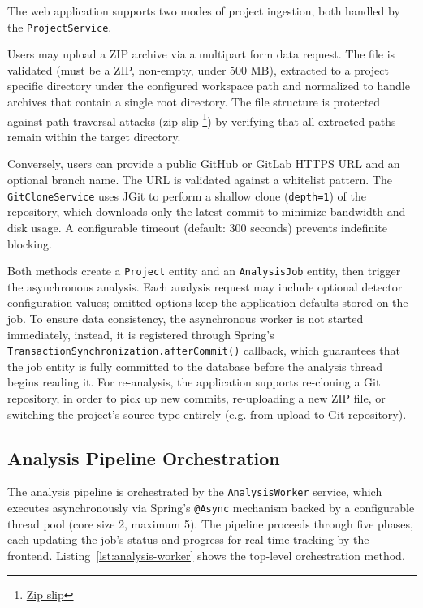 \par The web application supports two modes of project ingestion, both handled by the \texttt{ProjectService}.

\par Users may upload a ZIP archive via a multipart form data request. The file is validated (must be a ZIP, non-empty, under 500 MB), extracted to a project specific directory under the configured workspace path and normalized to handle archives that contain a single root directory. The file structure is protected against path traversal attacks (zip slip \footnote{\href{https://maven.apache.org/security-plexus-archiver.html}{Zip slip}}) by verifying that all extracted paths remain within the target directory.

\par Conversely, users can provide a public GitHub or GitLab HTTPS URL and an optional branch name. The URL is validated against a whitelist pattern. The \texttt{Git\-Clone\-Ser\-vice} uses JGit to perform a shallow clone (\texttt{depth=1}) of the repository, which downloads only the latest commit to minimize bandwidth and disk usage. A configurable timeout (default: 300 seconds) prevents indefinite blocking.

Both methods create a \texttt{Project} entity and an \texttt{AnalysisJob} entity, then trigger the asynchronous analysis. Each analysis request may include optional detector configuration values; omitted options keep the application defaults stored on the job. To ensure data consistency, the asynchronous worker is not started immediately, instead, it is registered through Spring's \texttt{Tran\-sac\-tionSyn\-chron\-i\-zation.afterCommit()} callback, which guarantees that the job entity is fully committed to the database before the analysis thread begins reading it. For re-analysis, the application supports re-cloning a Git repository, in order to pick up new commits, re-uploading a new ZIP file, or switching the project's source type entirely (e.g. from upload to Git repository).

\subsection{Analysis Pipeline Orchestration}
\label{subsec: analysis-pipeline}

 \par The analysis pipeline is orchestrated by the \texttt{AnalysisWorker} service, which executes asynchronously via Spring's \texttt{@Async} mechanism backed by a configurable thread pool (core size 2, maximum 5). The pipeline proceeds through five phases, each updating the job's status and progress for real-time tracking by the frontend. Listing~\ref{lst:analysis-worker} shows the top-level orchestration method.

